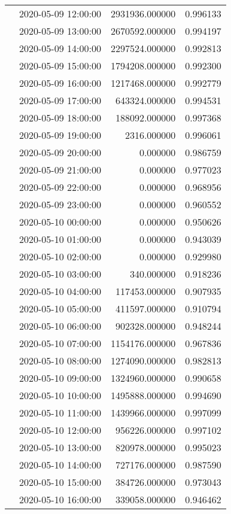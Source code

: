\begin{tabular}{llrr}
 & 2020-05-09 12:00:00 & 2931936.000000 & 0.996133 \\
 & 2020-05-09 13:00:00 & 2670592.000000 & 0.994197 \\
 & 2020-05-09 14:00:00 & 2297524.000000 & 0.992813 \\
 & 2020-05-09 15:00:00 & 1794208.000000 & 0.992300 \\
 & 2020-05-09 16:00:00 & 1217468.000000 & 0.992779 \\
 & 2020-05-09 17:00:00 & 643324.000000 & 0.994531 \\
 & 2020-05-09 18:00:00 & 188092.000000 & 0.997368 \\
 & 2020-05-09 19:00:00 & 2316.000000 & 0.996061 \\
 & 2020-05-09 20:00:00 & 0.000000 & 0.986759 \\
 & 2020-05-09 21:00:00 & 0.000000 & 0.977023 \\
 & 2020-05-09 22:00:00 & 0.000000 & 0.968956 \\
 & 2020-05-09 23:00:00 & 0.000000 & 0.960552 \\
 & 2020-05-10 00:00:00 & 0.000000 & 0.950626 \\
 & 2020-05-10 01:00:00 & 0.000000 & 0.943039 \\
 & 2020-05-10 02:00:00 & 0.000000 & 0.929980 \\
 & 2020-05-10 03:00:00 & 340.000000 & 0.918236 \\
 & 2020-05-10 04:00:00 & 117453.000000 & 0.907935 \\
 & 2020-05-10 05:00:00 & 411597.000000 & 0.910794 \\
 & 2020-05-10 06:00:00 & 902328.000000 & 0.948244 \\
 & 2020-05-10 07:00:00 & 1154176.000000 & 0.967836 \\
 & 2020-05-10 08:00:00 & 1274090.000000 & 0.982813 \\
 & 2020-05-10 09:00:00 & 1324960.000000 & 0.990658 \\
 & 2020-05-10 10:00:00 & 1495888.000000 & 0.994690 \\
 & 2020-05-10 11:00:00 & 1439966.000000 & 0.997099 \\
 & 2020-05-10 12:00:00 & 956226.000000 & 0.997102 \\
 & 2020-05-10 13:00:00 & 820978.000000 & 0.995023 \\
 & 2020-05-10 14:00:00 & 727176.000000 & 0.987590 \\
 & 2020-05-10 15:00:00 & 384726.000000 & 0.973043 \\
 & 2020-05-10 16:00:00 & 339058.000000 & 0.946462 \\

\end{tabular}
